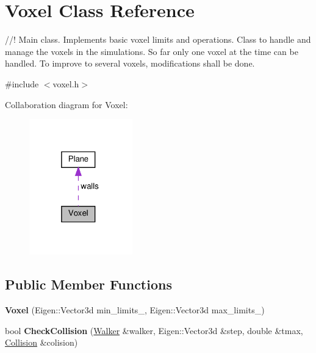 \hypertarget{class_voxel}{}\section{Voxel Class Reference}
\label{class_voxel}


//! Main class. Implements basic voxel limits and operations. Class to handle and manage the voxels in the simulations. So far only one voxel at the time can be handled. To improve to several voxels, modifications shall be done.  




{\ttfamily \#include $<$voxel.\+h$>$}



Collaboration diagram for Voxel\+:
\nopagebreak
\begin{figure}[H]
\begin{center}
\leavevmode
\includegraphics[width=127pt]{class_voxel__coll__graph}
\end{center}
\end{figure}
\subsection*{Public Member Functions}
\begin{DoxyCompactItemize}
\item 
\mbox{\label{class_voxel_acbb05a2f277a8ae7c59119eb3adf7e8c}} 
{\bfseries Voxel} (Eigen\+::\+Vector3d min\+\_\+limits\+\_\+, Eigen\+::\+Vector3d max\+\_\+limits\+\_\+)
\item 
\mbox{\label{class_voxel_af52a1ec58a5244591c56963b28192748}} 
bool {\bfseries Check\+Collision} (\hyperlink{class_walker}{Walker} \&walker, Eigen\+::\+Vector3d \&step, double \&tmax, \hyperlink{class_collision}{Collision} \&colision)
\end{DoxyCompactItemize}
